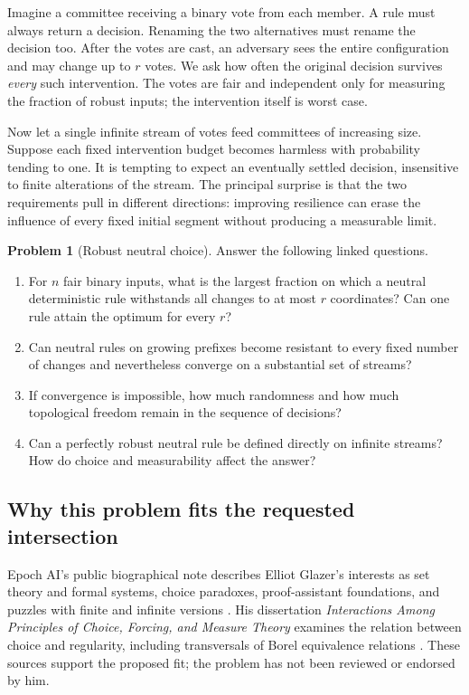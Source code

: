 \documentclass[11pt]{article}
\theoremstyle{definition}
\newtheorem{problem}[theorem]{Problem}
\theoremstyle{remark}
\begin{document}
Imagine a committee receiving a binary vote from each member. A rule must always
return a decision. Renaming the two alternatives must rename the decision too.
After the votes are cast, an adversary sees the entire configuration and may
change up to \(r\) votes. We ask how often the original decision survives
\emph{every} such intervention. The votes are fair and independent only for
measuring the fraction of robust inputs; the intervention itself is worst case.

Now let a single infinite stream of votes feed committees of increasing size.
Suppose each fixed intervention budget becomes harmless with probability tending
to one. It is tempting to expect an eventually settled decision, insensitive to
finite alterations of the stream. The principal surprise is that the two
requirements pull in different directions: improving resilience can erase the
influence of every fixed initial segment without producing a measurable limit.

\begin{problem}[Robust neutral choice]
\label{rch:prob:main}
Answer the following linked questions.
\begin{enumerate}[label=(\roman*)]
\item For \(n\) fair binary inputs, what is the largest fraction on which a
neutral deterministic rule withstands all changes to at most \(r\) coordinates?
Can one rule attain the optimum for every \(r\)?
\item Can neutral rules on growing prefixes become resistant to every fixed
number of changes and nevertheless converge on a substantial set of streams?
\item If convergence is impossible, how much randomness and how much
topological freedom remain in the sequence of decisions?
\item Can a perfectly robust neutral rule be defined directly on infinite
streams? How do choice and measurability affect the answer?
\end{enumerate}
\end{problem}

\subsection{Why this problem fits the requested intersection}

Epoch AI's public biographical note describes Elliot Glazer's interests as set
theory and formal systems, choice paradoxes, proof-assistant foundations, and
puzzles with finite and infinite versions \cite{Epoch}. His dissertation
\emph{Interactions Among Principles of Choice, Forcing, and Measure Theory}
examines the relation between choice and regularity, including transversals of
Borel equivalence relations \cite{Glazer}. These sources support the proposed
fit; the problem has not been reviewed or endorsed by him.
\end{document}
